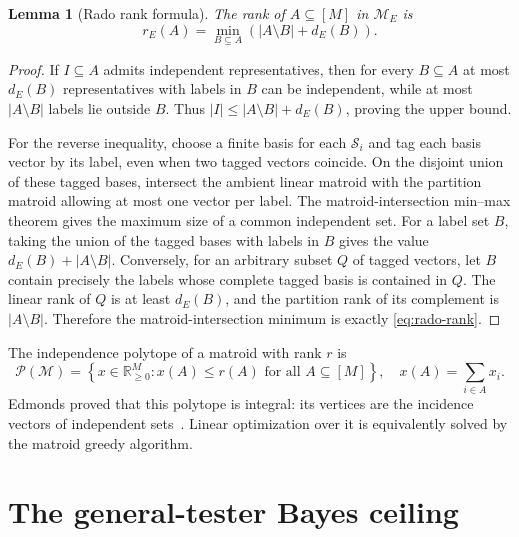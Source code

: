\documentclass[11pt]{article}
\newtheorem{lemma}[theorem]{Lemma}
\theoremstyle{definition}
\theoremstyle{remark}
\newcommand{\cM}{\mathcal M}
\newcommand{\cP}{\mathcal P}
\newcommand{\cS}{\mathcal S}
\begin{document}
\begin{lemma}[Rado rank formula]\label{lem:rado-rank}
The rank of $A\subseteq[M]$ in $\cM_E$ is
\begin{equation}
 r_E(A)=\min_{B\subseteq A}
       \left(|A\setminus B|+d_E(B)\right).              \label{eq:rado-rank}
\end{equation}
\end{lemma}

\begin{proof}
If $I\subseteq A$ admits independent representatives, then for every
$B\subseteq A$ at most $d_E(B)$ representatives with labels in $B$ can be
independent, while at most $|A\setminus B|$ labels lie outside $B$.  Thus
$|I|\leq |A\setminus B|+d_E(B)$, proving the upper bound.

For the reverse inequality, choose a finite basis for each $\cS_i$ and tag
each basis vector by its label, even when two tagged vectors coincide.  On the
disjoint union of these tagged bases, intersect the ambient linear matroid
with the partition matroid allowing at most one vector per label.  The
matroid-intersection min--max theorem gives the maximum size of a common
independent set.  For a label set $B$, taking the union of the tagged bases
with labels in $B$ gives the value $d_E(B)+|A\setminus B|$.  Conversely, for
an arbitrary subset $Q$ of tagged vectors, let $B$ contain precisely the
labels whose complete tagged basis is contained in $Q$.  The linear rank of
$Q$ is at least $d_E(B)$, and the partition rank of its complement is
$|A\setminus B|$.  Therefore the matroid-intersection minimum is exactly
\cref{eq:rado-rank}.
\end{proof}

The independence polytope of a matroid with rank $r$ is
\begin{equation}
 \cP(\cM)=\left\{x\in\mathbb R_{\geq0}^M:
                  x(A)\leq r(A)\text{ for all }A\subseteq[M]\right\},
 \quad x(A)=\sum_{i\in A}x_i.                           \label{eq:polytope}
\end{equation}
Edmonds proved that this polytope is integral: its vertices are the incidence
vectors of independent sets~\cite{edmonds1970}.  Linear optimization over it
is equivalently solved by the matroid greedy algorithm.

\section{The general-tester Bayes ceiling}
\end{document}
